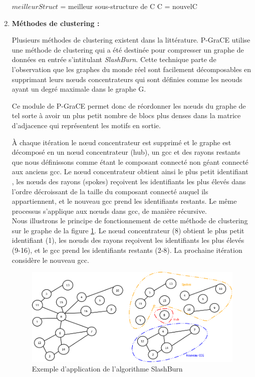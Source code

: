 \documentclass[a4paper,oneside,12pt]{report}
\theoremstyle{definition}
\begin{document}
\begin{enumerate}
\begin{algorithm}[H]
\begin{algorithmic} [1]
					\STATE $meilleurStruct$  = meilleur sous-structure de C
					\ENDIF
					\STATE C = nouvelC
					
				\end{algorithmic}
			\end{algorithm}



\item \textbf{Méthodes de clustering :}

Plusieurs méthodes de clustering existent dans la littérature. P-GraCE utilise une  méthode de clustering qui a été destinée pour compresser un graphe de données en entrée s'intitulant \textit{SlashBurn}. Cette technique parte de l'observation  que les graphes du monde réel sont facilement décomposables en supprimant leurs nœuds concentrateurs qui sont définies comme les neouds ayant un degré maximale dans le graphe G.  

Ce module de P-GraCE permet donc de réordonner les nœuds du graphe de tel sorte à avoir un plus petit nombre de blocs plus denses dans la matrice d'adjacence qui représentent les motifs en sortie.  

À chaque itération le nœud concentrateur est supprimé et le graphe est décomposé en un nœud concentrateur (hub), un
\gls{gcc} et des rayons restants que nous définissons comme étant le composant connecté non géant connecté aux anciens \gls{gcc}. Le nœud concentrateur obtient ainsi le plus petit identifiant , les nœuds des rayons (spokes) reçoivent les identifiants les plus élevés  dans l’ordre décroissant de la taille du composant connecté auquel ils appartiennent, et le nouveau \gls{gcc} prend les identifiants restants. Le même processus s'applique aux nœuds dans \gls{gcc}, de manière récursive.\\

Nous illustrons le principe de fonctionnement de cette méthode de clustering sur le graphe de la figure \ref{Img:slashb}. Le nœud concentrateur (8) obtient le plus petit identifiant (1), les nœuds des rayons reçoivent les identifiants les plus élevés (9-16), et le \gls{gcc} prend les identifiants restants (2-8). La prochaine itération considère le nouveau \gls{gcc}.

\begin{figure}[H]
	\centering
	\label{Img:slashb}
	\includegraphics[scale=0.25]{ressources/image/slashburn.png}
	\caption{Exemple d'application de l'algorithme SlashBurn}


\end{figure}
\end{enumerate}
\end{document}
